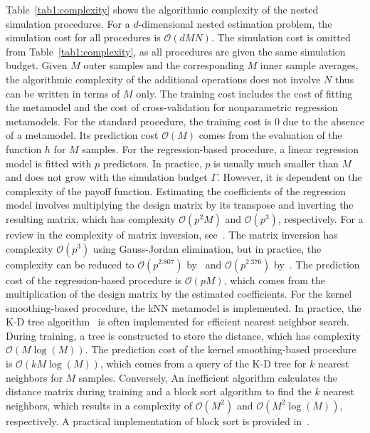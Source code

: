 Table~\ref{tab1:complexity} shows the algorithmic complexity of the nested simulation procedures.
For a $d$-dimensional nested estimation problem, the simulation cost for all procedures is $\mathcal{O}(dMN)$.
The simulation cost is omitted from Table~\ref{tab1:complexity}, as all procedures are given the same simulation budget.
Given $M$ outer samples and the corresponding $M$ inner sample averages, the algorithmic complexity of the additional operations does not involve $N$ thus can be written in terms of $M$ only.
The training cost includes the cost of fitting the metamodel and the cost of cross-validation for nonparametric regression metamodels.
For the standard procedure, the training cost is $0$ due to the absence of a metamodel. 
Its prediction cost $\mathcal{O}(M)$ comes from the evaluation of the function $h$ for $M$ samples.
For the regression-based procedure, a linear regression model is fitted with $p$ predictors.
In practice, $p$ is usually much smaller than $M$ and does not grow with the simulation budget $\Gamma$.
However, it is dependent on the complexity of the payoff function.
Estimating the coefficients of the regression model involves multiplying the design matrix by its transpose and inverting the resulting matrix, which has complexity $\mathcal{O}(p^2M)$ and $\mathcal{O}(p^3)$, respectively.
For a review in the complexity of matrix inversion, see~\cite{stothers2010complexity}.
The matrix inversion has complexity $\mathcal{O}(p^3)$ using Gauss-Jordan elimination, but in practice, the complexity can be reduced to $\mathcal{O}(p^{2.807})$ by~\cite{strassen1969gaussian} and $\mathcal{O}(p^{2.376})$ by~\cite{coppersmith1987matrix}.
The prediction cost of the regression-based procedure is $\mathcal{O}(pM)$, which comes from the multiplication of the design matrix by the estimated coefficients.
For the kernel smoothing-based procedure, the kNN metamodel is implemented.
In practice, the K-D tree algorithm~\citep{bentley1975multidimensional} is often implemented for efficient nearest neighbor search.
During training, a tree is constructed to store the distance, which has complexity $\mathcal{O}(M\log(M))$.
The prediction cost of the kernel smoothing-based procedure is $\mathcal{O}(kM\log(M))$, which comes from a query of the K-D tree for $k$ nearest neighbors for $M$ samples.
Conversely, An inefficient algorithm calculates the distance matrix during training and a block sort algorithm to find the $k$ nearest neighbors, which results in a complexity of $\mathcal{O}(M^2)$ and $\mathcal{O}(M^2\log(M))$, respectively.
A practical implementation of block sort is provided in~\cite{kim2008ratio}.
